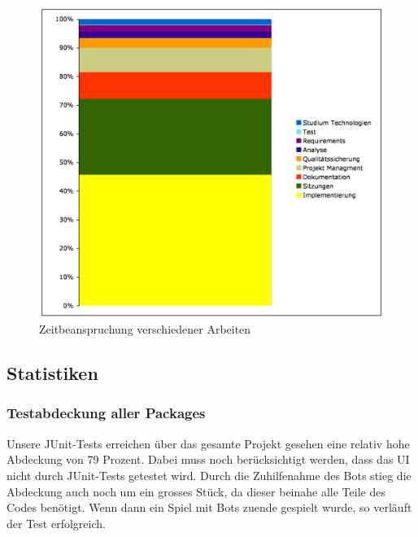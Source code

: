 \documentclass[12pt,halfparskip]{scrartcl}
\begin{document}
\begin{figure}[h]
	\centering
	\includegraphics[width=0.8 \textwidth]{zeitbeachspruchung_arbeiten}
	\caption{Zeitbeanspruchung verschiedener Arbeiten}
	\label{fig:zeitbeachspruchung_arbeiten}
\end{figure}

\subsection{Statistiken}
\subsubsection{Testabdeckung aller Packages}
Unsere JUnit-Tests erreichen über das gesamte Projekt gesehen eine relativ hohe Abdeckung von 79 Prozent. Dabei muss noch berücksichtigt werden, dass das UI nicht durch JUnit-Tests getestet wird. Durch die Zuhilfenahme des Bots stieg die Abdeckung auch noch um ein grosses Stück, da dieser beinahe alle Teile des Codes benötigt. Wenn dann ein Spiel mit Bots zuende gespielt wurde, so verläuft der Test erfolgreich.
\end{document}
